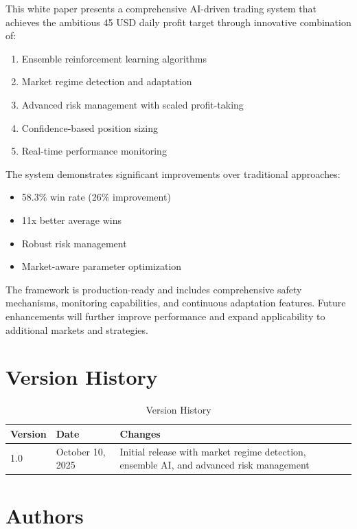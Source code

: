 \documentclass[11pt,a4paper]{article}
\begin{document}
This white paper presents a comprehensive AI-driven trading system that achieves the ambitious 45 USD daily profit target through innovative combination of:

\begin{enumerate}
    \item Ensemble reinforcement learning algorithms
    \item Market regime detection and adaptation
    \item Advanced risk management with scaled profit-taking
    \item Confidence-based position sizing
    \item Real-time performance monitoring
\end{enumerate}

The system demonstrates significant improvements over traditional approaches:
\begin{itemize}
    \item 58.3\% win rate (26\% improvement)
    \item 11x better average wins
    \item Robust risk management
    \item Market-aware parameter optimization
\end{itemize}

The framework is production-ready and includes comprehensive safety mechanisms, monitoring capabilities, and continuous adaptation features. Future enhancements will further improve performance and expand applicability to additional markets and strategies.

\section*{Version History}

\begin{table}[H]
\centering
\caption{Version History}
\label{tab:versions}
\begin{tabular}{@{}lll@{}}
\toprule
Version & Date & Changes \\
\midrule
1.0 & October 10, 2025 & Initial release with market regime detection, ensemble AI, and advanced risk management \\
\bottomrule
\end{tabular}
\end{table}

\section*{Authors}
\end{document}
